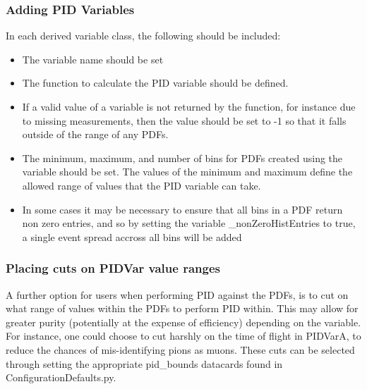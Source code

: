 \subsubsection{Adding PID Variables}
\label{addvar}
In each derived variable class, the following should be included:
\begin{itemize}
\item The variable name should be set
\item The function to calculate the PID variable should be defined.  
\item If a valid value of a variable is not returned by the function, for instance due to missing measurements, then the value should be set to -1 so that it falls outside of the range of any PDFs.
\item The minimum, maximum, and number of bins for PDFs created using 
the variable should be set. The values of the minimum and maximum 
define the allowed range of values that the PID variable can take.
\item In some cases it may be necessary to ensure that all bins in a 
PDF return non zero entries, and so by setting the variable 
\_nonZeroHistEntries to true, a single event spread accross all bins 
will be added
\end{itemize}

\subsubsection{Placing cuts on PIDVar value ranges}
A further option for users when performing PID against the PDFs, is to cut on what range of values within the PDFs to perform PID within. This may allow for greater purity (potentially at the expense of efficiency) depending on the variable. For instance, one could choose to cut harshly on the time of flight in PIDVarA, to reduce the chances of mis-identifying pions as muons. These cuts can be selected through setting the appropriate pid\_bounds datacards found in ConfigurationDefaults.py.


